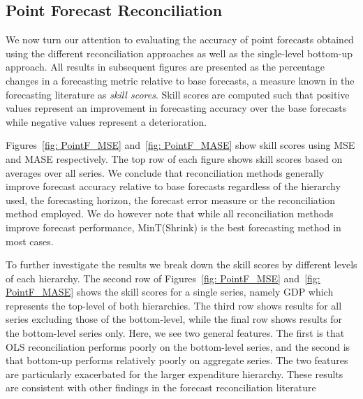 \documentclass[graybox]{svmult}
\begin{document}
\subsection{Point Forecast Reconciliation}

We now turn our attention to evaluating the accuracy of point forecasts obtained using the different reconciliation approaches as well as the single-level bottom-up approach. All results in subsequent figures are presented as the percentage changes in a forecasting metric relative to base forecasts, a measure known in the forecasting literature as \emph{skill scores}. Skill scores are computed such that positive values represent an improvement in forecasting accuracy over the base forecasts while negative values represent a deterioration.

Figures~\ref{fig: PointF_MSE} and~\ref{fig: PointF_MASE} show skill scores using MSE and MASE respectively. The top row of each figure shows skill scores based on averages over all series. We conclude that reconciliation methods generally improve forecast accuracy relative to base forecasts regardless of the hierarchy used, the forecasting horizon, the forecast error measure or the reconciliation method employed. We do however note that while all reconciliation methods improve forecast performance, MinT(Shrink) is the best forecasting method in most cases.

To further investigate the results we break down the skill scores by different levels of each hierarchy. The second row of Figures~\ref{fig: PointF_MSE} and~\ref{fig: PointF_MASE} shows the skill scores for a single series, namely GDP which represents the top-level of both hierarchies. The third row shows results for all series excluding those of the bottom-level, while the final row shows results for the bottom-level series only. Here, we see two general features. The first is that OLS reconciliation performs poorly on the bottom-level series, and the second is that bottom-up performs relatively poorly on aggregate series. The two features are particularly exacerbated for the larger expenditure hierarchy. These results are consistent with other findings in the forecast reconciliation literature \citep[see for instance][]{AthEtAl2017,WicEtAl2019}
\end{document}
